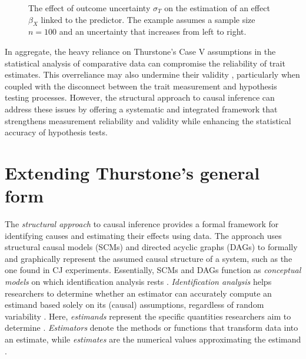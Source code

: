 \documentclass[
  authoryear,
  review,
  1p]{elsarticle}
\begin{document}
\begin{figure}


\caption{\label{fig-measurement_error}The effect of outcome uncertainty
\(\sigma_{T}\) on the estimation of an effect \(\beta_{X}\) linked to
the predictor. The example assumes a sample size \(n=100\) and an
uncertainty that increases from left to right.}

\end{figure}%

In aggregate, the heavy reliance on Thurstone's Case V assumptions in
the statistical analysis of comparative data can compromise the
reliability of trait estimates. This overreliance may also undermine
their validity \citep[pp.~2]{Perron_et_al_2015}, particularly when
coupled with the disconnect between the trait measurement and hypothesis
testing processes. However, the structural approach to causal inference
can address these issues by offering a systematic and integrated
framework that strengthens measurement reliability and validity while
enhancing the statistical accuracy of hypothesis tests.

\section{Extending Thurstone's general form}\label{sec-theoretical}

The \emph{structural approach} to causal inference provides a formal
framework for identifying causes and estimating their effects using
data. The approach uses structural causal models (SCMs) and directed
acyclic graphs (DAGs)
\citep{Pearl_2009, Pearl_et_al_2016, Gross_et_al_2018, Neal_2020} to
formally and graphically represent the assumed causal structure of a
system, such as the one found in CJ experiments. Essentially, SCMs and
DAGs function as \emph{conceptual models} on which identification
analysis rests \citep[pp.~4]{Schuessler_et_al_2023}.
\emph{Identification analysis} helps researchers to determine whether an
estimator can accurately compute an estimand based solely on its
(causal) assumptions, regardless of random variability
\citep[pp.~4]{Schuessler_et_al_2023}. Here, \emph{estimands} represent
the specific quantities researchers aim to determine
\citep{Everitt_et_al_2010}. \emph{Estimators} denote the methods or
functions that transform data into an estimate, while \emph{estimates}
are the numerical values approximating the estimand
\citep{Neal_2020, Everitt_et_al_2010}.
\end{document}
